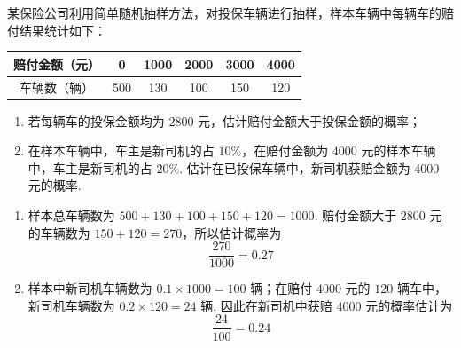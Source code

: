 \begin{problem}
某保险公司利用简单随机抽样方法，对投保车辆进行抽样，样本车辆中每辆车的赔付结果统计如下：

\begin{center}
\renewcommand{\arraystretch}{1.2}
\begin{tabular}{c|ccccc}
\hline
赔付金额（元） & 0 & 1000 & 2000 & 3000 & 4000 \\
\hline
车辆数（辆） & 500 & 130 & 100 & 150 & 120 \\
\hline
\end{tabular}
\end{center}

\begin{enumerate}
\item 若每辆车的投保金额均为 2800 元，估计赔付金额大于投保金额的概率；
\item 在样本车辆中，车主是新司机的占 \(10\%\)，在赔付金额为 4000 元的样本车辆中，车主是新司机的占 \(20\%\). 估计在已投保车辆中，新司机获赔金额为 4000 元的概率.
\end{enumerate}
\begin{solution}
\begin{enumerate}
\item 样本总车辆数为 \(500+130+100+150+120=1000\). 赔付金额大于 \(2800\) 元的车辆数为 \(150+120=270\)，所以估计概率为
\[
\frac{270}{1000}=0.27
\]

\item 样本中新司机车辆数为 \(0.1\times1000=100\) 辆；在赔付 \(4000\) 元的 \(120\) 辆车中，新司机车辆数为 \(0.2\times120=24\) 辆. 因此在新司机中获赔 \(4000\) 元的概率估计为
\[
\frac{24}{100}=0.24
\]
\end{enumerate}
\end{solution}
\end{problem}

